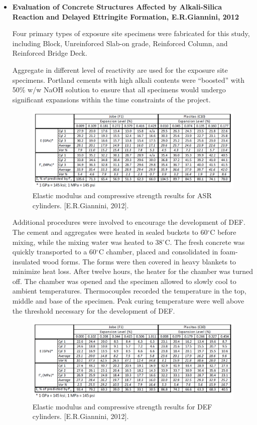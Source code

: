 \begin{itemize}

    \item
    \textbf{Evaluation of Concrete Structures Affected by Alkali-Silica Reaction and Delayed Ettringite Formation, E.R.Giannini, 2012}

    Four primary types of exposure site specimens were fabricated for this study, including Block, Unreinforced Slab-on grade, Reinforced Column, and Reinforced Bridge Deck.

    Aggregate in different level of reactivity are used for the exposure site specimens. Portland cements with high alkali contents were “boosted” with 50\% w/w NaOH solution to ensure that all specimens would undergo significant expansions within the time constraints of the project.

    \begin{figure}[ht!]
        \centering
        \includegraphics[width=.9\linewidth]{Files/Background/GIANNINI_ASR.png}
        \caption{Elastic modulus and compressive strength results for ASR cylinders. [E.R.Giannini, 2012].}
        \label{fig:GIANNINI_DEF}
    \end{figure}

    Additional procedures were involved to encourage the development of DEF. The cement and aggregates were heated in sealed buckets to 60$^\circ$C before mixing, while the mixing water was heated to 38$^\circ$C. The fresh concrete was quickly transported to a 60$^\circ$C chamber, placed and consolidated in foam-insulated wood forms. The forms were then covered in heavy blankets to minimize heat loss. After twelve hours, the heater for the chamber was turned off. The chamber was opened and the specimen allowed to slowly cool to ambient temperatures. Thermocouples recorded the temperature in the top, middle and base of the specimen. Peak curing temperature were well above the threshold necessary for the development of DEF.

    \begin{figure}[ht!]
        \centering
        \includegraphics[width=.9\linewidth]{Files/Background/GIANNINI_DEF.png}
        \caption{Elastic modulus and compressive strength results for DEF cylinders. [E.R.Giannini, 2012].}
        \label{fig:GIANNINI_DEF}
    \end{figure}



\end{itemize}
